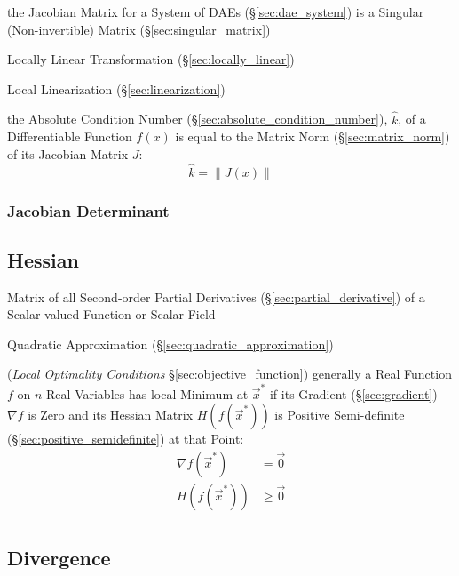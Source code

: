 \fist the Jacobian Matrix for a System of DAEs (\S\ref{sec:dae_system}) is
a Singular (Non-invertible) Matrix (\S\ref{sec:singular_matrix})

\fist Locally Linear Transformation (\S\ref{sec:locally_linear})

\fist Local Linearization (\S\ref{sec:linearization})

the Absolute Condition Number (\S\ref{sec:absolute_condition_number}),
$\hat{k}$, of a Differentiable Function $f(x)$ is equal to the Matrix Norm
(\S\ref{sec:matrix_norm}) of its Jacobian Matrix $J$:
\[
  \hat{k} = \|J(x)\|
\]



\subsubsection{Jacobian Determinant}\label{sec:jacobian_determinant}



\subsection{Hessian}\label{sec:hessian}

Matrix of all Second-order Partial Derivatives (\S\ref{sec:partial_derivative})
of a Scalar-valued Function or Scalar Field

\fist Quadratic Approximation (\S\ref{sec:quadratic_approximation})

(\emph{Local Optimality Conditions} \S\ref{sec:objective_function}) generally a
Real Function $f$ on $n$ Real Variables has local Minimum at $\vec{x}^*$ if its
Gradient (\S\ref{sec:gradient}) $\nabla f$ is Zero and its Hessian Matrix
$H(f(\vec{x}^*))$ is Positive Semi-definite (\S\ref{sec:positive_semidefinite})
at that Point:
\begin{align*}
  \nabla f(\vec{x}^*) & = \vec{0}    \\
  H(f(\vec{x}^*))     & \geq \vec{0} \\
\end{align*}



\subsection{Divergence}\label{sec:divergence}

